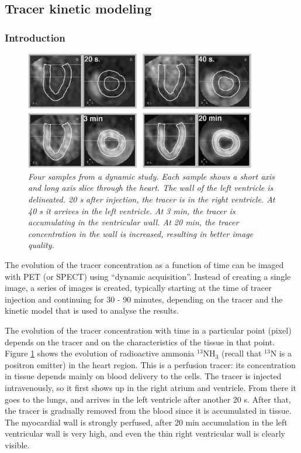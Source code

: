 \documentclass[11pt,oneside]{article}
\begin{document}
\subsection{Tracer kinetic modeling}
\subsubsection{Introduction}
\begin{figure}[tb]
\centering
\includegraphics[width=0.9\textwidth]{figs/fig_dyncardio.pdf}
\caption{\label{fig:dyncardio} \emph{Four samples from a dynamic
study. Each sample shows a short axis and long axis slice through the
heart. The wall of the left ventricle is delineated. 20 s after
injection, the tracer is in the right ventricle. At 40 s it arrives in
the left ventricle. At 3 min, the tracer is accumulating in the
ventricular wall. At 20 min, the tracer concentration in the wall is
increased, resulting in better image quality.}}
\end{figure}

The evolution of the tracer concentration as a function of time can be
imaged with PET (or SPECT) using ``dynamic acquisition''. Instead of
creating a single image, a series of images is created, typically
starting at the time of tracer injection and continuing for 30 - 90
minutes, depending on the tracer and the kinetic model that is used to
analyse the results.

The evolution of the tracer concentration with time in a particular
point (pixel) depends on the tracer and on the characteristics of the
tissue in that point. Figure \ref{fig:dyncardio} shows the evolution
of radioactive ammonia $^{13}$NH$_3$ (recall that $^{13}$N is a
positron emitter) in the heart region. This is a perfusion tracer: its
concentration in tissue depends mainly on blood delivery to the
cells. The tracer is injected intravenously, so it first shows up in
the right atrium and ventricle. From there it goes to the lungs, and
arrives in the left ventricle after another 20 s. After that, the
tracer is gradually removed from the blood since it is accumulated in
tissue. The myocardial wall is strongly perfused, after 20 min
accumulation in the left ventricular wall is very high, and even the
thin right ventricular wall is clearly visible.
\end{document}
